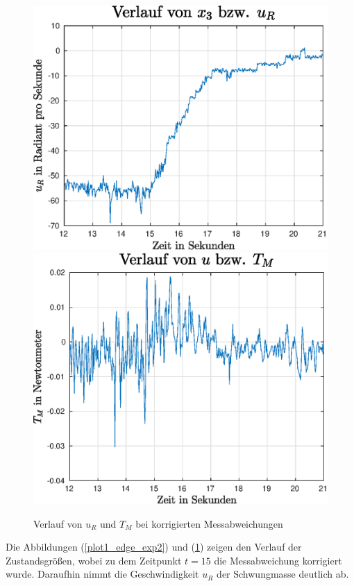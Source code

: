 \begin{figure}[h!]
\includegraphics[width=0.45\linewidth]{img/edge_exp2_ur.eps}
\includegraphics[width=0.45\linewidth]{img/edge_exp2_tm.eps}
\caption{Verlauf von $u_R$ und $T_M$ bei korrigierten Messabweichungen}
\label{plot2_edge_exp2}
\end{figure}
\newpage
Die Abbildungen (\ref{plot1_edge_exp2}) und (\ref{plot2_edge_exp2}) zeigen den Verlauf der Zustandsgrößen, wobei zu dem Zeitpunkt $t=15$ die Messabweichung korrigiert wurde. Daraufhin nimmt die Geschwindigkeit $u_R$ der Schwungmasse deutlich ab.

